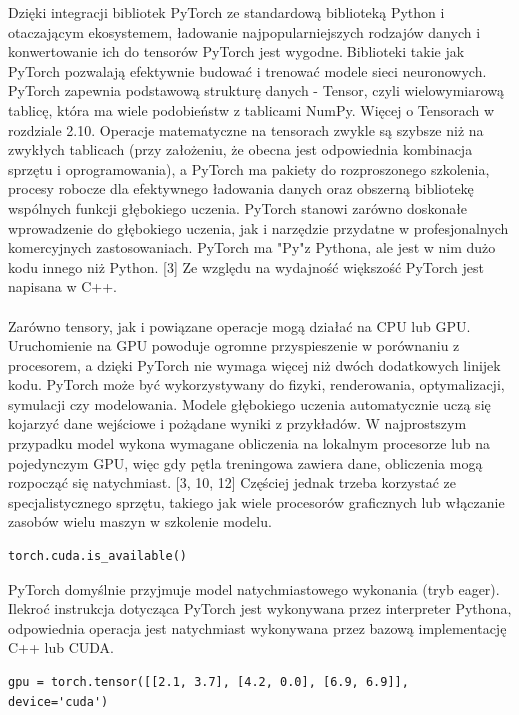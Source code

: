 \documentclass[openright]{xmgr}
\begin{document}
Dzięki integracji bibliotek PyTorch ze standardową biblioteką Python i otaczającym ekosystemem, ładowanie najpopularniejszych rodzajów danych i konwertowanie ich do tensorów PyTorch jest wygodne.􏰹Biblioteki takie jak PyTorch pozwalają efektywnie budować i trenować modele sieci neuronowych. PyTorch zapewnia podstawową strukturę danych - Tensor, czyli wielowymiarową tablicę, która ma wiele podobieństw z tablicami NumPy. Więcej o Tensorach w rozdziale 2.10. Operacje matematyczne na tensorach zwykle są szybsze niż na zwykłych tablicach (przy założeniu, że obecna jest odpowiednia kombinacja sprzętu i oprogramowania), a PyTorch ma pakiety do rozproszonego szkolenia, procesy robocze dla efektywnego ładowania danych oraz obszerną bibliotekę wspólnych funkcji głębokiego uczenia. PyTorch stanowi zarówno doskonałe wprowadzenie do głębokiego uczenia, jak i narzędzie przydatne w profesjonalnych komercyjnych zastosowaniach. PyTorch ma "Py"z Pythona, ale jest w nim dużo kodu innego niż Python. [3] Ze względu na wydajność większość PyTorch jest napisana w C++. \\
\\
\indent \indent Zarówno tensory, jak i powiązane operacje mogą działać na CPU lub GPU. Uruchomienie na GPU powoduje ogromne przyspieszenie w porównaniu z procesorem, a dzięki PyTorch nie wymaga więcej niż dwóch dodatkowych linijek kodu. PyTorch może być wykorzystywany do fizyki, renderowania, optymalizacji, symulacji czy modelowania. Modele głębokiego uczenia automatycznie uczą się kojarzyć dane wejściowe i pożądane wyniki z przykładów. W najprostszym przypadku model wykona wymagane obliczenia na lokalnym procesorze lub na pojedynczym GPU, więc gdy pętla treningowa zawiera dane, obliczenia mogą rozpocząć się natychmiast. [3, 10, 12] Częściej jednak trzeba korzystać ze specjalistycznego sprzętu, takiego jak wiele procesorów graficznych lub włączanie zasobów wielu maszyn w szkolenie modelu.

\begin{lstlisting}
torch.cuda.is_available()
\end{lstlisting}


PyTorch domyślnie przyjmuje model natychmiastowego wykonania (tryb eager).
Ilekroć instrukcja dotycząca PyTorch jest wykonywana przez interpreter Pythona, odpowiednia operacja jest natychmiast wykonywana przez bazową implementację C++ lub CUDA. 


\begin{lstlisting}
gpu = torch.tensor([[2.1, 3.7], [4.2, 0.0], [6.9, 6.9]], device='cuda')
\end{lstlisting}
\end{document}
